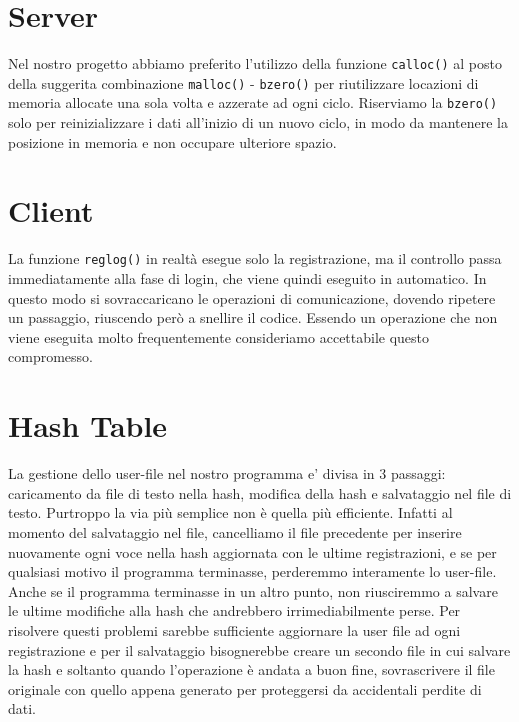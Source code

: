 \documentclass[a4paper, 11pt]{article} %
\begin{document}
\section*{Server}
 Nel nostro progetto abbiamo preferito l'utilizzo della funzione \texttt{calloc()} al posto della suggerita combinazione \texttt{malloc()} - \texttt{bzero()} per riutilizzare locazioni di memoria allocate una sola volta e azzerate ad ogni ciclo. Riserviamo la \texttt{bzero()} solo per reinizializzare i dati all'inizio di un nuovo ciclo, in modo da mantenere la posizione in memoria e non occupare ulteriore spazio.

\section*{Client}
La funzione \texttt{reglog()} in realtà esegue solo la registrazione, ma il controllo passa immediatamente alla fase di login, che viene quindi eseguito in automatico. In questo modo si sovraccaricano le operazioni di comunicazione, dovendo ripetere un passaggio, riuscendo però a snellire il codice. Essendo un operazione che non viene eseguita molto frequentemente consideriamo accettabile questo compromesso. 
	
\section*{Hash Table}
La gestione dello user-file nel nostro programma e' divisa in 3 passaggi: caricamento da file di testo nella hash, modifica della hash e salvataggio nel file di testo. Purtroppo la via più semplice non è quella più efficiente. Infatti al momento del salvataggio nel file, cancelliamo il file precedente per inserire nuovamente ogni voce nella hash aggiornata con le ultime registrazioni, e se per qualsiasi motivo il programma terminasse, perderemmo interamente lo user-file. Anche se il programma terminasse in un altro punto, non riusciremmo a salvare le ultime modifiche alla hash che andrebbero irrimediabilmente perse. Per risolvere questi problemi sarebbe sufficiente aggiornare la user file ad ogni registrazione e per il salvataggio bisognerebbe creare un secondo file in cui salvare la hash e soltanto quando l'operazione è andata a buon fine, sovrascrivere il file originale con quello appena generato per proteggersi da accidentali perdite di dati.
\end{document}
